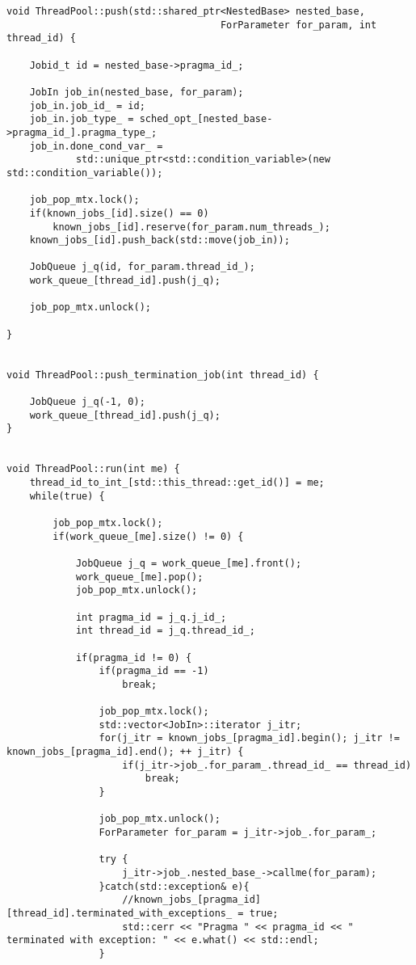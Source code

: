 \documentclass[a4paper,10pt,twoside]{book}
\begin{document}
\begin{lstlisting}[language=CCC, caption=thread\_pool.cpp]
void ThreadPool::push(std::shared_ptr<NestedBase> nested_base,
                                     ForParameter for_param, int thread_id) {
    
    Jobid_t id = nested_base->pragma_id_;
        
    JobIn job_in(nested_base, for_param);
    job_in.job_id_ = id;
    job_in.job_type_ = sched_opt_[nested_base->pragma_id_].pragma_type_;
    job_in.done_cond_var_ =
            std::unique_ptr<std::condition_variable>(new std::condition_variable());
       
    job_pop_mtx.lock();
    if(known_jobs_[id].size() == 0)
        known_jobs_[id].reserve(for_param.num_threads_);
    known_jobs_[id].push_back(std::move(job_in));

    JobQueue j_q(id, for_param.thread_id_);
    work_queue_[thread_id].push(j_q);
    
    job_pop_mtx.unlock();

}


void ThreadPool::push_termination_job(int thread_id) {

    JobQueue j_q(-1, 0);
    work_queue_[thread_id].push(j_q);
}


void ThreadPool::run(int me) {
    thread_id_to_int_[std::this_thread::get_id()] = me;
    while(true) {
        
        job_pop_mtx.lock();
        if(work_queue_[me].size() != 0) {

            JobQueue j_q = work_queue_[me].front();
            work_queue_[me].pop();
            job_pop_mtx.unlock();
            
            int pragma_id = j_q.j_id_;
            int thread_id = j_q.thread_id_;

            if(pragma_id != 0) {
                if(pragma_id == -1)
                    break;
                
                job_pop_mtx.lock();
                std::vector<JobIn>::iterator j_itr;
                for(j_itr = known_jobs_[pragma_id].begin(); j_itr != known_jobs_[pragma_id].end(); ++ j_itr) {
                    if(j_itr->job_.for_param_.thread_id_ == thread_id)
                        break;
                }
               
                job_pop_mtx.unlock();
                ForParameter for_param = j_itr->job_.for_param_;
                
                try {
                    j_itr->job_.nested_base_->callme(for_param);
                }catch(std::exception& e){
                    //known_jobs_[pragma_id][thread_id].terminated_with_exceptions_ = true;
                    std::cerr << "Pragma " << pragma_id << " terminated with exception: " << e.what() << std::endl;
                }



\end{lstlisting}
\end{document}
